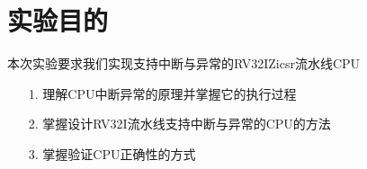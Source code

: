 \section{实验目的}
本次实验要求我们实现支持中断与异常的RV32IZicsr流水线CPU
\begin{itemize}
    \item [1.] 理解CPU中断异常的原理并掌握它的执行过程
    \item [2.] 掌握设计RV32I流水线支持中断与异常的CPU的方法
    \item [3.] 掌握验证CPU正确性的方式
\end{itemize}    